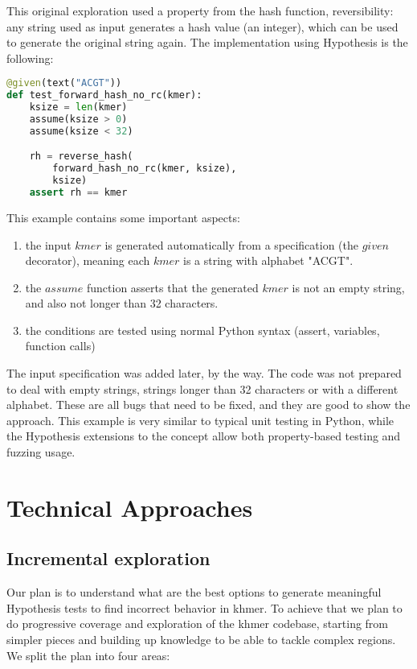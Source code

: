 \documentclass[preprint,nocopyrightspace]{sig-alternate}
\begin{document}
This original exploration used a property from the hash function,
reversibility:
any string used as input generates a hash value (an integer),
which can be used to generate the original string again.
The implementation using Hypothesis is the following:

\begin{lstlisting}[language=Python]
@given(text("ACGT"))
def test_forward_hash_no_rc(kmer):
    ksize = len(kmer)
    assume(ksize > 0)
    assume(ksize < 32)

    rh = reverse_hash(
        forward_hash_no_rc(kmer, ksize),
        ksize)
    assert rh == kmer
\end{lstlisting}

This example contains some important aspects:
\begin{enumerate}
\item the input $kmer$ is generated automatically from a specification (the $given$ decorator),
meaning each $kmer$ is a string with alphabet "ACGT".
\item the $assume$ function asserts that the generated $kmer$ is not an empty string,
and also not longer than 32 characters.
\item the conditions are tested using normal Python syntax (assert, variables, function calls)
\end{enumerate}

The input specification was added later,
by the way.
The code was not prepared to deal with empty strings,
strings longer than 32 characters or with a different alphabet.
These are all bugs that need to be fixed,
and they are good to show the approach.
This example is very similar to typical unit testing in Python,
while the Hypothesis extensions to the concept allow both property-based testing and fuzzing usage.

\section{Technical Approaches}

\subsection{Incremental exploration}
Our plan is to understand what are the best options to generate meaningful Hypothesis tests to find incorrect behavior in khmer.
To achieve that we plan to do progressive coverage and exploration of the khmer codebase,
starting from simpler pieces and building up knowledge to be able to tackle complex regions.
We split the plan into four areas:
\end{document}
